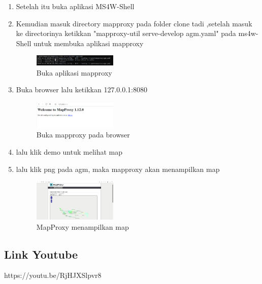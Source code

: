 \begin{enumerate}
  \item Setelah itu buka aplikasi MS4W-Shell
  \item Kemudian masuk directory mapproxy pada folder clone tadi ,setelah masuk ke directorinya ketikkan "mapproxy-util serve-develop agm.yaml" pada ms4w-Shell untuk membuka aplikasi mapproxy
  \hfill\break
  \begin{figure}[H]
  \includegraphics[width=4cm]{figures/Tugas4/1174074/16.png}
  \centering
  \caption{Buka aplikasi mapproxy}
  \end{figure}

  \item Buka browser lalu ketikkan 127.0.0.1:8080
  \hfill\break
  \begin{figure}[H]
  \includegraphics[width=4cm]{figures/Tugas4/1174074/17.png}
  \centering
  \caption{Buka mapproxy pada browser}
  \end{figure}

  \item lalu klik demo untuk melihat map
  \item lalu klik png pada agm, maka mapproxy akan menampilkan map
  \hfill\break
  \begin{figure}[H]
  \includegraphics[width=4cm]{figures/Tugas4/1174074/18.png}
  \centering
  \caption{MapProxy menampilkan map}
  \end{figure}

\end{enumerate}

\subsection{Link Youtube}
https://youtu.be/RjHJXSlpvr8